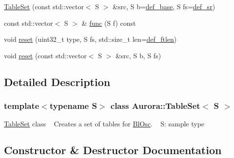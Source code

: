 \begin{DoxyCompactItemize}
\item 
\hyperlink{class_aurora_1_1_table_set_a884ecfde480fdac4c32fa10a82286941}{Table\+Set} (const std\+::vector$<$ S $>$ \&src, S b=\hyperlink{namespace_aurora_acb267dff62f74484893c2d5b679b78bf}{def\+\_\+base}, S fs=\hyperlink{namespace_aurora_ad49263d809bea98dd422e95bc91bc03e}{def\+\_\+sr})
\item 
const std\+::vector$<$ S $>$ \& \hyperlink{class_aurora_1_1_table_set_afd4c6f1ba81f6ae1feb42eabd95c1b7f}{func} (S f) const
\item 
void \hyperlink{class_aurora_1_1_table_set_ac2c945c49d53f60fd909dc771a6ff7e5}{reset} (uint32\+\_\+t type, S fs, std\+::size\+\_\+t len=\hyperlink{namespace_aurora_a14dabfd9feedfa09c0e6f86d2627f006}{def\+\_\+ftlen})
\item 
void \hyperlink{class_aurora_1_1_table_set_afec852dca45285ec57b6a4a97dffac36}{reset} (const std\+::vector$<$ S $>$ \&src, S b, S fs)
\end{DoxyCompactItemize}


\subsection{Detailed Description}
\subsubsection*{template$<$typename S$>$\newline
class Aurora\+::\+Table\+Set$<$ S $>$}

\hyperlink{class_aurora_1_1_table_set}{Table\+Set} class ~\newline
Creates a set of tables for \hyperlink{class_aurora_1_1_bl_osc}{Bl\+Osc}. ~\newline
S\+: sample type 

\subsection{Constructor \& Destructor Documentation}
\mbox{\label{class_aurora_1_1_table_set_a0be4528b972606335d73ac312da6337b}} 
